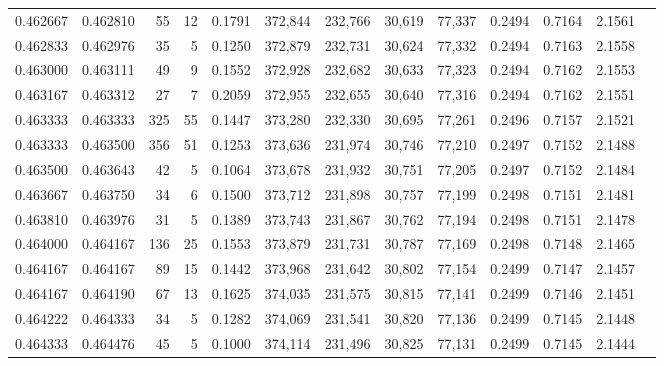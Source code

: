 \begin{tabular}{rrrrrrrrrrrrr}
0.462667 & 0.462810 &    55 &  12 &                                     0.1791 & 372,844 & 232,766 &  30,619 &  77,337 & 0.2494 & 0.7164 & 2.1561 \\
0.462833 & 0.462976 &    35 &   5 &                                     0.1250 & 372,879 & 232,731 &  30,624 &  77,332 & 0.2494 & 0.7163 & 2.1558 \\
0.463000 & 0.463111 &    49 &   9 &                                     0.1552 & 372,928 & 232,682 &  30,633 &  77,323 & 0.2494 & 0.7162 & 2.1553 \\
0.463167 & 0.463312 &    27 &   7 &                                     0.2059 & 372,955 & 232,655 &  30,640 &  77,316 & 0.2494 & 0.7162 & 2.1551 \\
0.463333 & 0.463333 &   325 &  55 &                                     0.1447 & 373,280 & 232,330 &  30,695 &  77,261 & 0.2496 & 0.7157 & 2.1521 \\
0.463333 & 0.463500 &   356 &  51 &                                     0.1253 & 373,636 & 231,974 &  30,746 &  77,210 & 0.2497 & 0.7152 & 2.1488 \\
0.463500 & 0.463643 &    42 &   5 &                                     0.1064 & 373,678 & 231,932 &  30,751 &  77,205 & 0.2497 & 0.7152 & 2.1484 \\
0.463667 & 0.463750 &    34 &   6 &                                     0.1500 & 373,712 & 231,898 &  30,757 &  77,199 & 0.2498 & 0.7151 & 2.1481 \\
0.463810 & 0.463976 &    31 &   5 &                                     0.1389 & 373,743 & 231,867 &  30,762 &  77,194 & 0.2498 & 0.7151 & 2.1478 \\
0.464000 & 0.464167 &   136 &  25 &                                     0.1553 & 373,879 & 231,731 &  30,787 &  77,169 & 0.2498 & 0.7148 & 2.1465 \\
0.464167 & 0.464167 &    89 &  15 &                                     0.1442 & 373,968 & 231,642 &  30,802 &  77,154 & 0.2499 & 0.7147 & 2.1457 \\
0.464167 & 0.464190 &    67 &  13 &                                     0.1625 & 374,035 & 231,575 &  30,815 &  77,141 & 0.2499 & 0.7146 & 2.1451 \\
0.464222 & 0.464333 &    34 &   5 &                                     0.1282 & 374,069 & 231,541 &  30,820 &  77,136 & 0.2499 & 0.7145 & 2.1448 \\
0.464333 & 0.464476 &    45 &   5 &                                     0.1000 & 374,114 & 231,496 &  30,825 &  77,131 & 0.2499 & 0.7145 & 2.1444 \\

\end{tabular}
